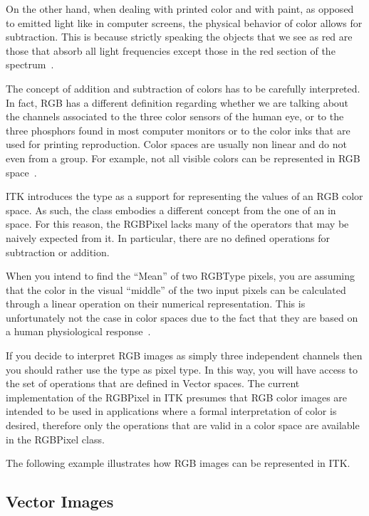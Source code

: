 On the other hand, when dealing with printed color and with paint, as opposed
to emitted light like in computer screens, the physical behavior of color
allows for subtraction. This is because strictly speaking the objects that we
see as red are those that absorb all light frequencies except those in the red
section of the spectrum~\cite{Wyszecki2000}.

The concept of addition and subtraction of colors has to be carefully
interpreted. In fact, RGB has a different definition regarding whether we are
talking about the channels associated to the three color sensors of the human
eye, or to the three phosphors found in most computer monitors or to the color
inks that are used for printing reproduction. Color spaces are usually non
linear and do not even from a group. For example, not all visible colors can be
represented in RGB space~\cite{Wyszecki2000}.

ITK introduces the  type as a support for representing the
values of an RGB color space. As such, the  class embodies a different
concept from the one of an  in space. For this reason, the
RGBPixel lacks many of the operators that may be naively expected from it. In
particular, there are no defined operations for subtraction or addition.

When you intend to find the ``Mean'' of two RGBType pixels, you are assuming that
the color in the visual ``middle'' of the two input pixels can be calculated through
a linear operation on their numerical representation. This is unfortunately not the
case in  color spaces due to the fact that they are based on a human physiological
response~\cite{Malacara2002}.

If you decide to interpret RGB images as simply three independent channels then
you should rather use the  type as pixel type. In this way, you
will have access to the set of operations that are defined in Vector spaces.
The current implementation of the RGBPixel in ITK presumes that RGB color
images are intended to be used in applications where a formal interpretation of
color is desired, therefore only the operations that are valid in a color space
are available in the RGBPixel class.

The following example illustrates how RGB images can be represented in ITK.

\label{sec:DefiningRGBImages}



\subsection{Vector Images}
\label{sec:DefiningVectorImages}


